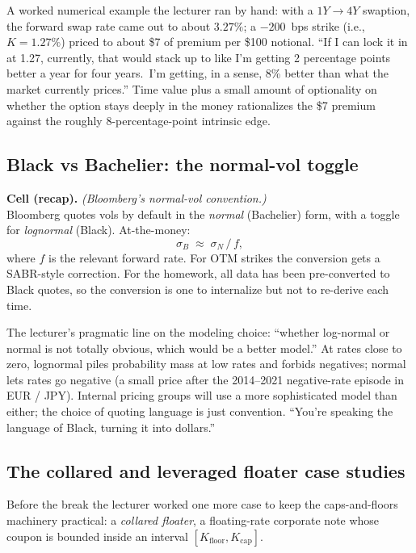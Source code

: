 A worked numerical example the lecturer ran by hand: with a
$1Y \to 4Y$ swaption, the forward swap rate came out to about $3.27\%$;
a $-200$~bps strike (i.e., $K = 1.27\%$) priced to about \$7 of premium
per \$100 notional. ``If I can lock it in at 1.27, currently, that
would stack up to like I'm getting 2 percentage points better a year
for four years.\ I'm getting, in a sense, 8\% better than what the
market currently prices.'' Time value plus a small amount of optionality
on whether the option stays deeply in the money rationalizes the
\$7 premium against the roughly 8-percentage-point intrinsic edge.

\subsection{Black vs Bachelier: the normal-vol toggle}\label{L7-sec:normal-toggle}

\begin{keyblock}
\textbf{Cell (recap).} \emph{(Bloomberg's normal-vol convention.)}\\
Bloomberg quotes vols by default in the \emph{normal} (Bachelier) form,
with a toggle for \emph{lognormal} (Black). At-the-money:
\[
  \sigma_B \;\approx\; \sigma_N \,/\, f,
\]
where $f$ is the relevant forward rate. For OTM strikes the conversion
gets a SABR-style correction. For the homework, all data has been
pre-converted to Black quotes, so the conversion is one to internalize
but not to re-derive each time.
\end{keyblock}

The lecturer's pragmatic line on the modeling choice: ``whether
log-normal or normal is not totally obvious, which would be a better
model.'' At rates close to zero, lognormal piles probability mass at
low rates and forbids negatives; normal lets rates go negative (a
small price after the 2014--2021 negative-rate episode in EUR / JPY).
Internal pricing groups will use a more sophisticated model than
either; the choice of quoting language is just convention. ``You're
speaking the language of Black, turning it into dollars.''

\subsection{The collared and leveraged floater case studies}\label{L7-sec:collared}

Before the break the lecturer worked one more case to keep the
caps-and-floors machinery practical: a \emph{collared floater}, a
floating-rate corporate note whose coupon is bounded inside an
interval $[K_{\text{floor}}, K_{\text{cap}}]$.

